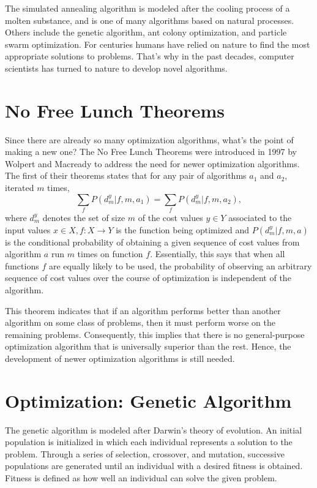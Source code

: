 \par The simulated annealing algorithm is modeled after the cooling process of a molten substance, and is one of many algorithms based on natural processes. Others include the genetic algorithm, ant colony optimization, and particle swarm optimization. For centuries humans have relied on nature to find the most appropriate solutions to problems. That's why in the past decades, computer scientists has turned to nature to develop novel algorithms.

\section{No Free Lunch Theorems}
\par Since there are already so many optimization algorithms, what's the point of making a new one? The No Free Lunch Theorems were introduced in 1997 by Wolpert and Macready to address the need for newer optimization algorithms. The first of their theorems states that for any pair of algorithms $a_1$ and $a_2$, iterated $m$ times, $$ \sum_{f} P(d_{m}^{y}|f,m,a_1)=\sum_{f} P(d_{m}^{y}|f,m,a_2),$$ where $d_m^y$ denotes the set of size $m$ of the cost values $y\in Y$ associated to the input values $x\in X,f:X\to Y$ is the function being optimized and $P(d_m^y|f,m,a)$ is the conditional probability of obtaining a given sequence of cost values from algorithm $a$ run $m$ times on function $f$. Essentially, this says that when all functions $f$ are equally likely to be used, the probability of observing an arbitrary sequence of cost values over the course of optimization is independent of the algorithm.

\par This theorem indicates that if an algorithm performs better than another algorithm on some class of problems, then it must perform worse on the remaining problems. Consequently, this implies that there is no general-purpose optimization algorithm that is universally superior than the rest. Hence, the development of newer optimization algorithms is still needed.

\section{Optimization: Genetic Algorithm}
\par The genetic algorithm \cite{holland_2010} is modeled after Darwin’s theory of evolution. An initial population is initialized in which each individual represents a solution to the problem. Through a series of selection, crossover, and mutation, successive populations are generated until an individual with a desired fitness is obtained. Fitness is defined as how well an individual can solve the given problem.

